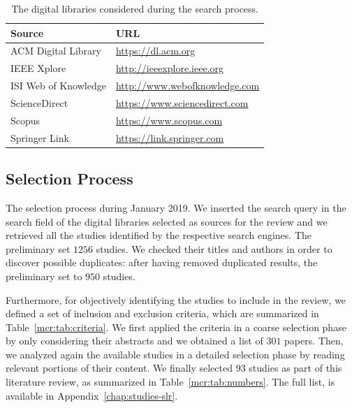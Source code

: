 \begin{table}
\centering
\begin{tabular}{@{}ll@{}}
\toprule
Source               & URL                                 \\ \midrule
ACM Digital Library  & \url{https://dl.acm.org}            \\
IEEE Xplore          & \url{http://ieeexplore.ieee.org}    \\
ISI Web of Knowledge & \url{http://www.webofknowledge.com} \\
ScienceDirect        & \url{https://www.sciencedirect.com} \\
Scopus               & \url{https://www.scopus.com}        \\
Springer Link        & \url{https://link.springer.com}     \\ \bottomrule
\end{tabular}
\caption[Digital libraries considered]{The digital libraries considered during the search process.}
\label{mcr:tab:sources}
\end{table}

\subsection{Selection Process}

The selection process  during January 2019. We inserted the search query in the search field of the digital libraries selected as sources for the review and we retrieved all the studies identified by the respective search engines.  The preliminary set  $1256$ studies. We checked their titles and authors in order to discover possible duplicates: after having removed duplicated results, the preliminary set  to $950$ studies.

Furthermore, for objectively identifying the studies to include in the review, we defined a set of inclusion and exclusion criteria, which are summarized in Table~\ref{mcr:tab:criteria}. We first applied the criteria in a coarse selection phase by only considering their abstracts and we obtained a list of $301$ papers. Then, we analyzed again the available studies in a detailed selection phase by reading relevant portions of their content. We finally selected $93$ studies as part of this literature review, as summarized in Table~\ref{mcr:tab:numbers}. The full list,  is available in Appendix~\ref{chap:studies-slr}.

